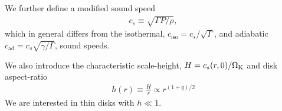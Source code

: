 

We further define a modified sound speed
\begin{align}
	c_s \equiv \sqrt{\Gamma P /\rho } , 
\end{align}
which in general differs from the  isothermal, $c_\mathrm{iso} =
c_s/\sqrt{\Gamma}$, and adiabatic $c_\mathrm{ad} =
c_s\sqrt{\gamma/\Gamma}$, sound speeds. 

We also introduce the characteristic scale-height, $H = c_s(r,0)/\Omega_{\rm K}$
and disk aspect-ratio
\begin{align}
   h(r) \equiv %
  \frac{H}{r} \propto r^{(1+q)/2}
\end{align}
We are interested in thin disks with $ h \ll 1$.



